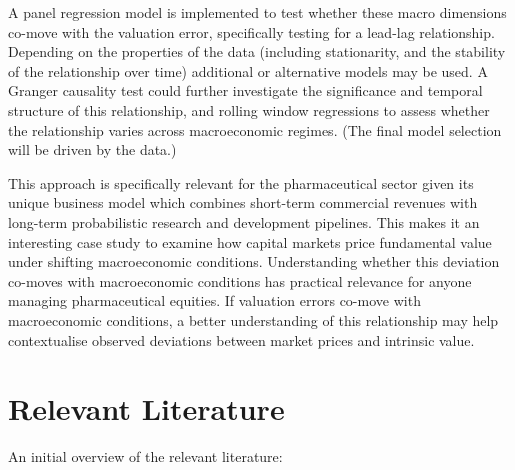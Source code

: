 \documentclass[11pt, a4paper]{article}
\begin{document}
A panel regression model is implemented to test whether these macro dimensions co-move with the valuation error, specifically testing for a lead-lag relationship. Depending on the properties of the data (including stationarity, and the stability of the relationship over time) additional or alternative models may be used. A Granger causality test could further investigate the significance and temporal structure of this relationship, and rolling window regressions to assess whether the relationship varies across macroeconomic regimes. (The final model selection will be driven by the data.)

This approach is specifically relevant for the pharmaceutical sector given its unique business model which combines short-term commercial revenues with long-term probabilistic research and development pipelines. This makes it an interesting case study to examine how capital markets price fundamental value under shifting macroeconomic conditions. Understanding whether this deviation co-moves with macroeconomic conditions has practical relevance for anyone managing pharmaceutical equities. If valuation errors co-move with macroeconomic conditions, a better understanding of this relationship may help contextualise observed deviations between market prices and intrinsic value.


\section{Relevant Literature}
An initial overview of the relevant literature:
\end{document}
